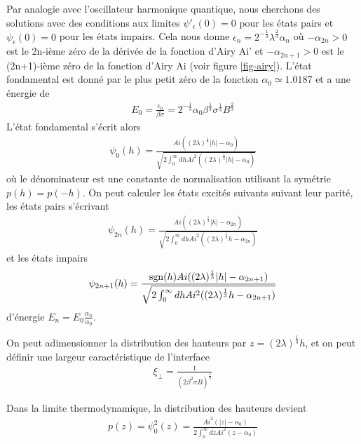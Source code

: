 Par analogie avec l'oscillateur harmonique quantique, nous cherchons des solutions avec des conditions aux limites $\psi'_\epsilon(0) = 0$ pour les états pairs et $\psi_\epsilon(0) = 0$ pour les états impairs. Cela nous donne $\epsilon_n = 2^{-\frac{1}{3}} \lambda^\frac{2}{3}\alpha_n$ où $-\alpha_{2n} \greater 0$ est le 2n-ième zéro de la dérivée de la fonction d'Airy Ai' et $-\alpha_{2n+1} \greater 0$ est le (2n+1)-ième zéro de la fonction d'Airy Ai (voir figure \ref{fig-airy}). L'état fondamental est donné par le plus petit zéro de la fonction $\alpha_0 \simeq 1.0187$ et a une énergie de 
\begin{align}
	E_0 = \frac{\epsilon_0}{\beta \sigma} = 2^{-\frac{1}{3}} \alpha_0 \beta^\frac{1}{3}\sigma^{\frac{1}{3}}B^\frac{2}{3}
\end{align}
L'état fondamental s'écrit alors
\begin{align}
	\psi_0(h) = \frac{ Ai ( (2\lambda)^\frac{1}{3} |h|-\alpha_0 )}{ \sqrt{2 \int_0^\infty dh Ai^2 ( (2\lambda)^\frac{1}{3} |h|-\alpha_0 ) }}
\end{align}
où le dénominateur est une constante de normalisation utilisant la symétrie $p(h)=p(-h)$.  
On peut calculer les états excités suivants suivant leur parité, les états pairs s'écrivant
\begin{align}
	\psi_{2n}(h) = \frac{ Ai ( (2\lambda)^\frac{1}{3} |h|-\alpha_{2n} )}{ \sqrt{2 \int_0^\infty dh Ai^2 ( (2\lambda)^\frac{1}{3} h-\alpha_{2n} ) }}
\end{align}
et les états impairs
\begin{align}
	\psi_{2n+1}(h) = \frac{ \operatorname{sgn}(h) Ai ( (2\lambda)^\frac{1}{3} |h|-\alpha_{2n+1} )}{ \sqrt{2 \int_0^\infty dh Ai^2 ( (2\lambda)^\frac{1}{3} h-\alpha_{2n+1} ) }}
\end{align}
d'énergie $E_{n} = E_0 \frac{\alpha_{n}}{\alpha_0}$. 

On peut adimensionner la distribution des hauteurs par $z = (2\lambda)^\frac{1}{3}h$, et on peut définir une largeur caractéristique de l'interface 
\begin{align}
	\xi_\perp = \frac{1}{(2\beta^2 \sigma B)^\frac{1}{3}}
	\label{xi_perp}
\end{align}


Dans la limite thermodynamique, la distribution des hauteurs  devient 
\begin{align}
	p(z) = \psi_0^2(z) = \frac{ Ai^2 ( |z|-\alpha_0 )}{ 2 \int_0^\infty dz Ai^2 ( z-\alpha_0 ) }
	\label{airy}
\end{align}
	
